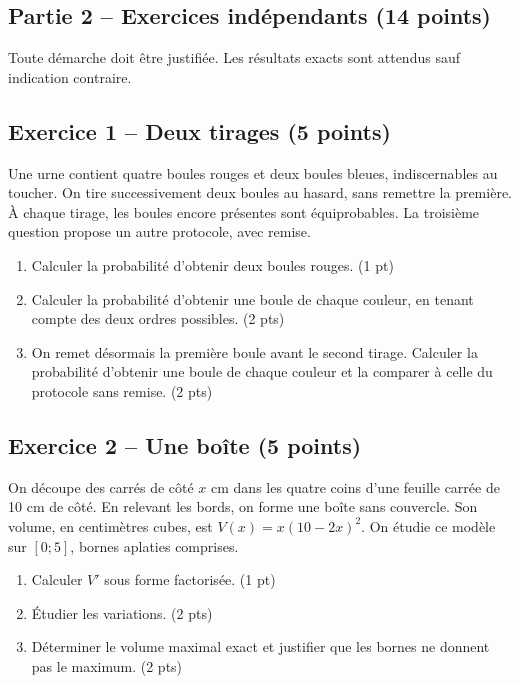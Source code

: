 \clearpage\subsection*{Partie 2 -- Exercices indépendants (14 points)}
Toute démarche doit être justifiée. Les résultats exacts sont attendus sauf indication contraire.
\subsection*{Exercice 1 -- Deux tirages (5 points)}
Une urne contient quatre boules rouges et deux boules bleues, indiscernables au toucher. On tire successivement deux boules au hasard, sans remettre la première. À chaque tirage, les boules encore présentes sont équiprobables. La troisième question propose un autre protocole, avec remise.
\begin{enumerate}
\item Calculer la probabilité d’obtenir deux boules rouges. \hfill(1 pt)
\item Calculer la probabilité d’obtenir une boule de chaque couleur, en tenant compte des deux ordres possibles. \hfill(2 pts)
\item On remet désormais la première boule avant le second tirage. Calculer la probabilité d’obtenir une boule de chaque couleur et la comparer à celle du protocole sans remise. \hfill(2 pts)
\end{enumerate}
\subsection*{Exercice 2 -- Une boîte (5 points)}
On découpe des carrés de côté $x$ cm dans les quatre coins d’une feuille carrée de 10 cm de côté. En relevant les bords, on forme une boîte sans couvercle. Son volume, en centimètres cubes, est $V(x)=x(10-2x)^2$. On étudie ce modèle sur $[0;5]$, bornes aplaties comprises.
\begin{enumerate}
\item Calculer $V\prime$ sous forme factorisée. \hfill(1 pt)
\item Étudier les variations. \hfill(2 pts)
\item Déterminer le volume maximal exact et justifier que les bornes ne donnent pas le maximum. \hfill(2 pts)
\end{enumerate}
